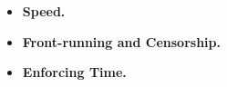 \begin{itemize}

\item \textbf{Speed.}

\item \textbf{Front-running and Censorship.}


\item \textbf{Enforcing Time.}

\end{itemize}















